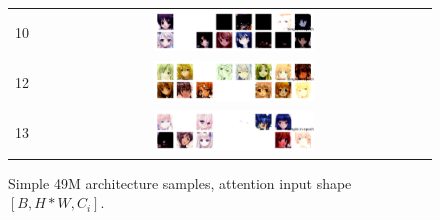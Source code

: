 \documentclass[twocolumn,superscriptaddress,aps]{revtex4-1}
\begin{document}
\begin{figure}[H]
\begin{tabular}{c|c}
10 & \includegraphics[width=0.42\textwidth]{figures/simple_unet_ddpm_49M_ckpt_epoch_10_2025-08-14_04-54-39_epoch_10_samples.png} \\
12 & \includegraphics[width=0.42\textwidth]{figures/simple_unet_ddpm_49M_ckpt_epoch_12_2025-08-14_10-13-47_epoch_12_samples.png} \\
13 & \includegraphics[width=0.42\textwidth]{figures/simple_unet_ddpm_49M_ckpt_epoch_13_2025-08-14_12-52-58_epoch_13_samples.png} 
\end{tabular}
\caption{Simple 49M architecture samples, attention input shape $[B, H*W, C_i]$.}
\label{tab:simple_49m}
\end{figure}
\end{document}

